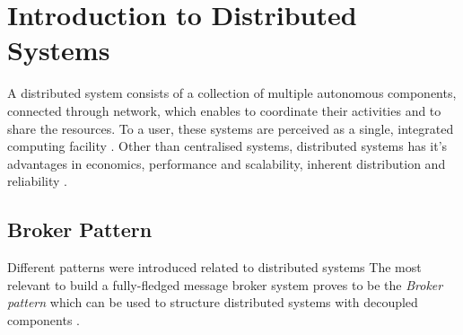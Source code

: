 \chapter{Introduction to Distributed Systems}

A distributed system consists of a collection of multiple autonomous components, connected through network, which enables to coordinate their activities and to share the resources. To a user, these systems are perceived as a single, integrated computing facility \cite{TAN06}. Other than centralised systems, distributed systems has it's advantages in economics, performance and scalability, inherent distribution and reliability \cite{POSA1}.

\section{Broker Pattern}

Different patterns were introduced related to distributed systems The most relevant to build a fully-fledged message broker system proves to be the \textit{Broker pattern} which can be used to structure distributed systems with decoupled components \cite{POSA1}. 
